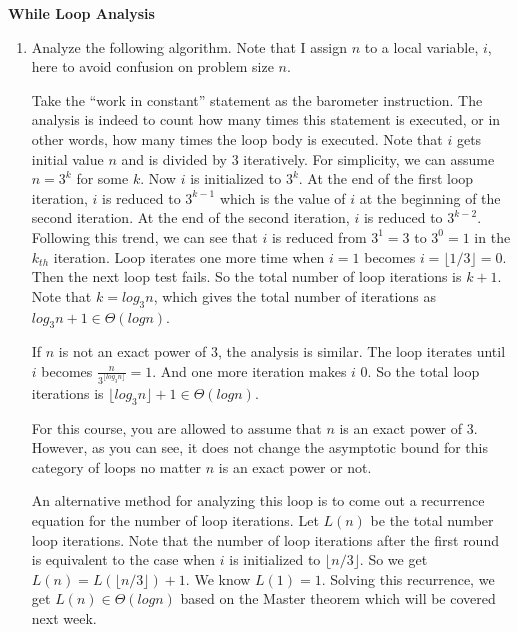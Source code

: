 \documentclass[10pt]{article}
\begin{document}
\begin{center}
{\Large \bf While Loop Analysis} \\
\end{center}

\begin{enumerate}
\item Analyze the following algorithm. Note that I assign $n$ to a local
  variable, $i$, here to avoid confusion on problem size $n$.

\begin{figure}[h]
\begin{center}
\begin{minipage}{7cm}
    \leavevmode
    
\end{minipage}
\end{center}
\end{figure}

Take the ``work in constant'' statement as the barometer instruction. The
analysis is indeed to count how many times this statement is executed, or in
other words, how many times the loop body is executed. Note that $i$ gets
initial value $n$ and is divided by 3 iteratively. For simplicity, we can
assume $n = 3^k$ for some $k$. Now $i$ is initialized to $3^k$. At the end of
the first loop iteration, $i$ is reduced to $3^{k-1}$ which is the value of
$i$ at the beginning of the second iteration. At the end of the second iteration,
$i$ is reduced to $3^{k-2}$. Following this trend, we can see that $i$ is
reduced from $3^1=3$ to $3^0=1$ in the $k_{th}$ iteration. Loop iterates one
more time when $i=1$ becomes $i=\lfloor 1/3 \rfloor =0$. Then the next loop test fails. So the
total number of loop iterations is $k+1$. Note that $k=log_3n$, which gives
the total number of iterations as $log_3n+1 \in \Theta(log n)$.

If $n$ is not an exact power of 3, the analysis is similar. The loop iterates until $i$
becomes  $\frac{n}{3^{\lfloor log_3n \rfloor}} = 1$. And one more iteration makes
$i$ 0. So the total loop iterations is $\lfloor log_3n \rfloor +1 \in
\Theta(log n)$.

For this course, you are allowed to assume that $n$ is an exact power of
3. However, as you can see, it does not change the asymptotic bound for this
category of loops no matter $n$ is an exact power or not.

An alternative method for analyzing this loop is to come out a recurrence
equation for the number of loop iterations. Let $L(n)$ be the total number loop
iterations. Note that the number of loop iterations after the first round is
equivalent to the case when $i$ is initialized to $\lfloor n/3 \rfloor$. So we get $L(n) =
L(\lfloor n/3 \rfloor) + 1$. We know $L(1) = 1$. Solving this recurrence, we
get $L(n) \in \Theta(log n)$ based on the Master theorem which will be covered
next week.



\end{enumerate}
\end{document}
